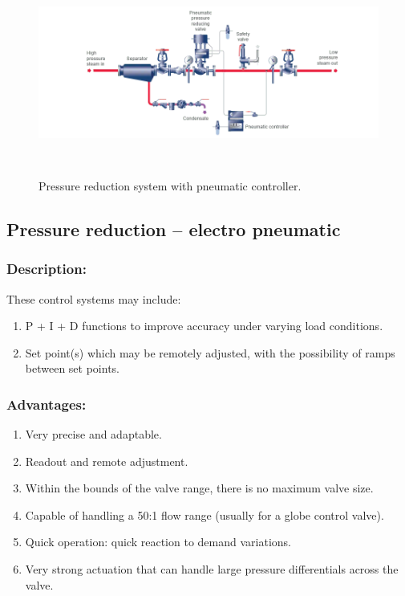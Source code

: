 \begin{figure}[h!]
  \centering
  \includegraphics[width=7.01231in,height=2.65972in]{figs/control_instrumentation/image1.png}
  \caption{Pressure reduction system with pneumatic controller.}
  \label{fig:Pressure reduction system with pneumatic controller.}
\end{figure}


\subsection{Pressure reduction -- electro pneumatic}

\subsubsection{Description:}

These control systems may include:

\begin{enumerate}
\item
  P + I + D functions to improve accuracy under varying load conditions.
\item
  Set point(s) which may be remotely adjusted, with the possibility of
  ramps between set points.
\end{enumerate}

\subsubsection{Advantages:}

\begin{enumerate}
\item
  Very precise and adaptable.
\item
  Readout and remote adjustment.
\item
  Within the bounds of the valve range, there is no maximum valve size.
\item
  Capable of handling a 50:1 flow range (usually for a globe control
  valve).
\item
  Quick operation: quick reaction to demand variations.
\item
  Very strong actuation that can handle large pressure differentials
  across the valve.
\end{enumerate}

